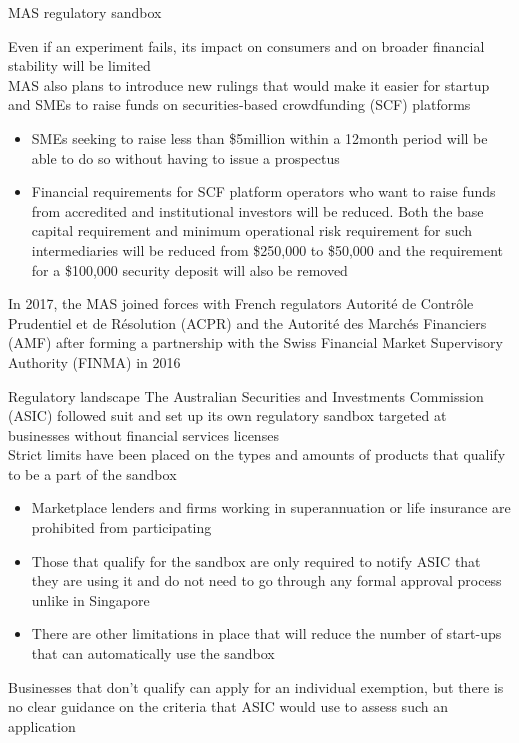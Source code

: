\documentclass[9pt]{beamer}
\begin{document}

\begin{frame}{MAS regulatory sandbox}
	\begin{small}
		Even if an experiment fails, its impact on consumers and on broader financial stability will be limited\\ \vspace{3mm}
		MAS also plans to introduce new rulings that would make it easier for startup and SMEs to raise funds on securities-based crowdfunding (SCF) platforms
		\begin{itemize}
			\item SMEs seeking to raise less than \$5million within a 12month period will be able to do so without having to issue a prospectus
			\item Financial requirements for SCF platform operators who want to raise funds from accredited and institutional investors will be reduced. Both the base capital requirement and minimum operational risk requirement for such intermediaries will be reduced from \$250,000 to \$50,000 and the requirement for a \$100,000 security deposit will also be removed
		\end{itemize}
		In 2017, the MAS joined forces with French regulators Autorit\'{e} de Contr\^{o}le Prudentiel et de R\'{e}solution (ACPR) and the Autorit\'{e} des March\'{e}s Financiers (AMF) after forming a partnership with the Swiss Financial Market Supervisory Authority (FINMA) in 2016
	\end{small}
\end{frame}


\begin{frame}{Regulatory landscape}
	The Australian Securities and Investments Commission (ASIC) followed suit and set up its own regulatory sandbox targeted at businesses without financial services licenses \\ \vspace{3mm}
	Strict limits have been placed on the types and amounts of products that qualify to be a part of the sandbox
	\begin{itemize}
		\item Marketplace lenders and firms working in superannuation or life insurance are prohibited from participating
		\item Those that qualify for the sandbox are only required to notify ASIC that they are using it and do not need to go through any formal approval process unlike in Singapore
		\item There are other limitations in place that will reduce the number of start-ups that can automatically use the sandbox
	\end{itemize}
	Businesses that don't qualify can apply for an individual exemption, but there is no clear guidance on the criteria that ASIC would use to assess such an application
\end{frame}
\end{document}
